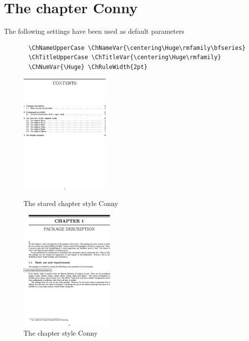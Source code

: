 \documentclass{report}
\begin{document}
    \section{The chapter Conny}
    The following settings have been used as default parameters
    {\small\begin{verbatim}
       \ChNameUpperCase \ChNameVar{\centering\Huge\rmfamily\bfseries}
       \ChTitleUpperCase \ChTitleVar{\centering\Huge\rmfamily}
       \ChNumVar{\Huge} \ChRuleWidth{2pt}
    \end{verbatim}}
    \begin{figure}[h]
      \begin{minipage}{7 cm}
        \centerline{\includegraphics[height=6cm]{Connys.eps}}
        \caption{The stared chapter style Conny}
      \end{minipage}\hfill
      \begin{minipage}{7 cm}
        \centerline{\includegraphics[height=6cm]{Conny.eps}}
        \caption{The chapter style Conny}
      \end{minipage}\hfill
    \end{figure}
\end{document}
